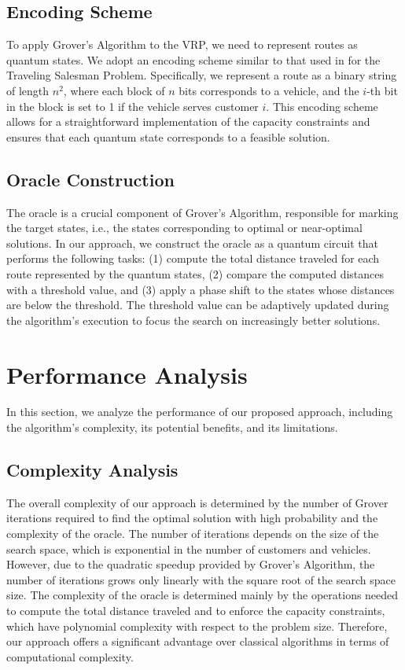 \subsection{Encoding Scheme}

To apply Grover's Algorithm to the VRP, we need to represent routes as quantum states. We adopt an encoding scheme similar to that used in \cite{zak2018} for the Traveling Salesman Problem. Specifically, we represent a route as a binary string of length $n^2$, where each block of $n$ bits corresponds to a vehicle, and the $i$-th bit in the block is set to 1 if the vehicle serves customer $i$. This encoding scheme allows for a straightforward implementation of the capacity constraints and ensures that each quantum state corresponds to a feasible solution.

\subsection{Oracle Construction}

The oracle is a crucial component of Grover's Algorithm, responsible for marking the target states, i.e., the states corresponding to optimal or near-optimal solutions. In our approach, we construct the oracle as a quantum circuit that performs the following tasks: (1) compute the total distance traveled for each route represented by the quantum states, (2) compare the computed distances with a threshold value, and (3) apply a phase shift to the states whose distances are below the threshold. The threshold value can be adaptively updated during the algorithm's execution to focus the search on increasingly better solutions.

\section{Performance Analysis}
\label{sec:analysis}

In this section, we analyze the performance of our proposed approach, including the algorithm's complexity, its potential benefits, and its limitations.

\subsection{Complexity Analysis}

The overall complexity of our approach is determined by the number of Grover iterations required to find the optimal solution with high probability and the complexity of the oracle. The number of iterations depends on the size of the search space, which is exponential in the number of customers and vehicles. However, due to the quadratic speedup provided by Grover's Algorithm, the number of iterations grows only linearly with the square root of the search space size. The complexity of the oracle is determined mainly by the operations needed to compute the total distance traveled and to enforce the capacity constraints, which have polynomial complexity with respect to the problem size. Therefore, our approach offers a significant advantage over classical algorithms in terms of computational complexity.

